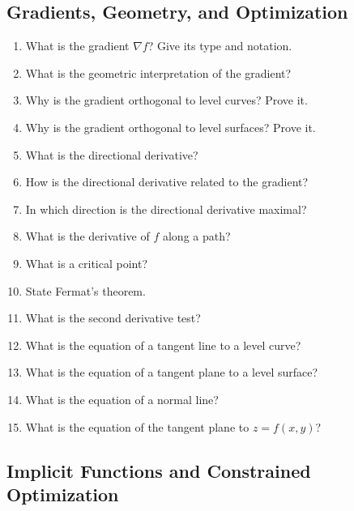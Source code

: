 \subsection*{Gradients, Geometry, and Optimization}

\begin{enumerate}

\item What is the gradient $\nabla f$? Give its type and notation.

\item What is the geometric interpretation of the gradient?

\item Why is the gradient orthogonal to level curves? Prove it.

\item Why is the gradient orthogonal to level surfaces? Prove it.

\item What is the directional derivative?

\item How is the directional derivative related to the gradient?

\item In which direction is the directional derivative maximal?

\item What is the derivative of $f$ along a path?

\item What is a critical point?

\item State Fermat's theorem.

\item What is the second derivative test?

\item What is the equation of a tangent line to a level curve?

\item What is the equation of a tangent plane to a level surface?

\item What is the equation of a normal line?

\item What is the equation of the tangent plane to $z=f(x,y)$?

\end{enumerate}

\subsection*{Implicit Functions and Constrained Optimization}

